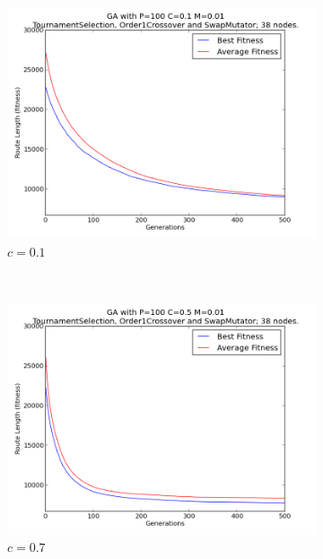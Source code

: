 \documentclass[10pt, a4paper]{article}
\begin{document}
\begin{figure}[h]
\centering

\begin{subfigure}[b]{0.67\textwidth}
\includegraphics[width=\textwidth]{img/results/order1crossover/swapmutator/n38p100c01m001}
\caption{$c = 0.1$}
\end{subfigure}
~
\begin{subfigure}[b]{0.67\textwidth}
\includegraphics[width=\textwidth]{img/results/order1crossover/swapmutator/n38p100c05m001}
\caption{$c = 0.7$}
\end{subfigure}
~
\begin{subfigure}[b]{0.67\textwidth}

\end{subfigure}
\end{figure}
\end{document}
